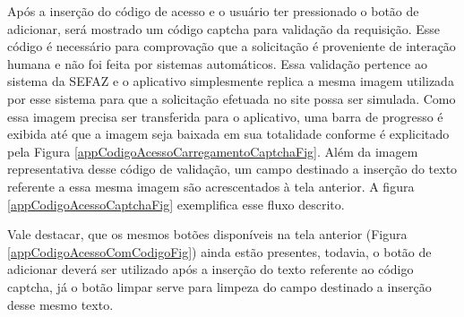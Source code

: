 \newpage
Após a inserção do código de acesso e o usuário ter pressionado o botão de adicionar, será mostrado um código captcha para validação da requisição. Esse código é necessário para comprovação que a solicitação é proveniente de interação humana e não foi feita por sistemas automáticos. Essa validação pertence ao sistema da SEFAZ e o aplicativo simplesmente replica a mesma imagem utilizada por esse sistema para que a solicitação efetuada no site possa ser simulada. Como essa imagem precisa ser transferida para o aplicativo, uma barra de progresso é exibida até que a imagem seja baixada em sua totalidade conforme é explicitado pela Figura \ref{appCodigoAcessoCarregamentoCaptchaFig}. Além da imagem representativa desse código de validação, um campo destinado a inserção do texto referente a essa mesma imagem são acrescentados à tela anterior. A figura \ref{appCodigoAcessoCaptchaFig} exemplifica esse fluxo descrito.

Vale destacar, que os mesmos botões disponíveis na tela anterior (Figura \ref{appCodigoAcessoComCodigoFig}) ainda estão presentes, todavia, o botão de adicionar deverá ser utilizado após a inserção do texto referente ao código captcha, já o botão limpar serve para limpeza do campo destinado a inserção desse mesmo texto.

